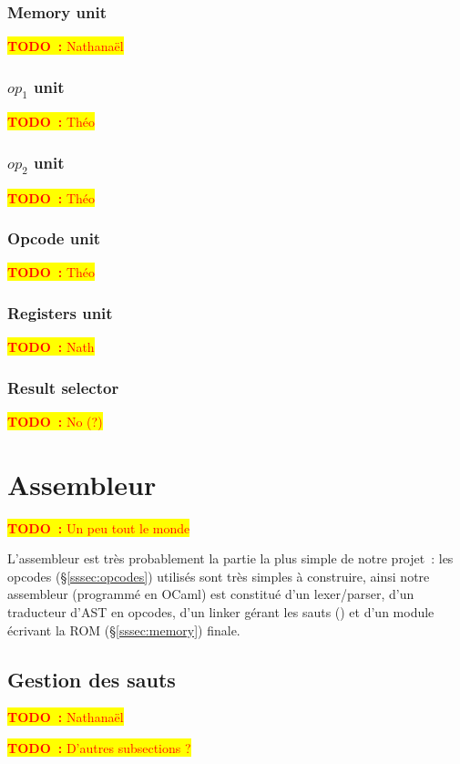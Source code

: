 \documentclass[11pt,a4paper]{article}
\newcommand{\htodo}[1]{\begin{huge}\colorbox{yellow}{\textcolor{red}{\textbf{TODO~:} #1}}\end{huge}}
\newcommand{\todo}[1]{\colorbox{yellow}{\textcolor{red}{\textbf{TODO~:} #1}}}
\begin{document}
\subsubsection{Memory unit}
\todo{Nathanaël}

\subsubsection{$op_1$ unit}
\todo{Théo}

\subsubsection{$op_2$ unit}
\todo{Théo}

\subsubsection{Opcode unit}
\todo{Théo}

\subsubsection{Registers unit}
\todo{Nath}

\subsubsection{Result selector}
\todo{No (?)}

\section{Assembleur} \label{sec:cas}

\htodo{Un peu tout le monde}

L'assembleur est très probablement la partie la plus simple de notre projet~: les opcodes (§\ref{sssec:opcodes}) utilisés sont très simples à construire, ainsi notre assembleur (programmé en OCaml) est constitué d'un lexer/parser, d'un traducteur d'AST en opcodes, d'un \og linker \fg{} gérant les sauts () et d'un module écrivant la ROM (§\ref{sssec:memory}) finale.

\subsection{Gestion des sauts}
\todo{Nathanaël}

\vspace{1em}\htodo{D'autres subsections ?}
\end{document}
